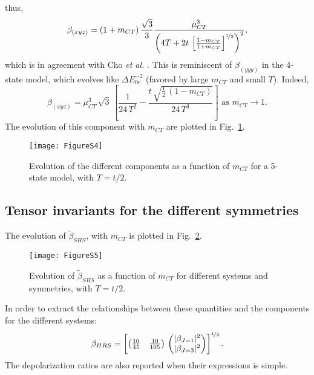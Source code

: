 \documentclass[journal=jpcafh]{achemso}
\begin{document}
thus,\begin{equation}
	\beta_{(xyz)} = (1+m_{CT})\,\frac{\sqrt{3}}{3}\frac{\mu_{CT}^3}{\left(4T + 2t\,\left[\frac{1-m_{CT}}{1+m_{CT}}\right]^{\nicefrac{1}{2}}\right)^2},\label{eq:5:xyz}
\end{equation}
which is in agreement with Cho \emph{et al.} \cite{choNonlinearOpticalProperties2002}. This is reminiscent of $\beta_{(yyy)}$ in the 4-state model, which evolves like $\Delta E_{0e}^{-2}$ (favored by large $m_{CT}$ and small $T$).  Indeed,\begin{equation}
	\beta_{(xyz)} = \mu_{CT}^3\,\sqrt{3}\,\left[\frac{1}{24\,T^2}-\frac{t\,\sqrt{\frac{1}{2}\,(1-m_{CT})}}{24\,T^3}\right] \text{ as } m_{CT}\to 1.
\end{equation}
The evolution of this component with $m_{CT}$ are plotted in Fig.~\ref{fig:5:cpt}.
 
 \begin{figure}
 	\texttt{[image: FigureS4]}
 	\caption{Evolution of the different components as a function of $m_{CT}$ for a  5-state model, with $T=t/2$.}
 	\label{fig:5:cpt}
 \end{figure}

\subsection{Tensor invariants for the different symmetries}


The evolution of $\tilde\beta_{SHS}$, with $m_{CT}$ is plotted in Fig.~\ref{fig:mct}.

\begin{figure}
	\texttt{[image: FigureS5]}
	\caption{Evolution of  $\tilde\beta_{SHS}$ as a function of $m_{CT}$ for different systems and symmetries, with $T=t/2$.}
	\label{fig:mct}
\end{figure}

\clearpage

In order to extract the relationships between these quantities and the components for the different systems:\begin{align}
	 \beta_{HRS} =\left[ \begin{pmatrix}
	 	\frac{10}{45} &  \frac{10}{105}
	 \end{pmatrix}\,\begin{pmatrix}
	 	|\beta_{J=1}|^2 \\ |\beta_{J=3}|^2
	 \end{pmatrix}\right]^{\nicefrac{1}{2}}.
\end{align}
The depolarization ratios are also reported when their expressions is simple.
\end{document}

